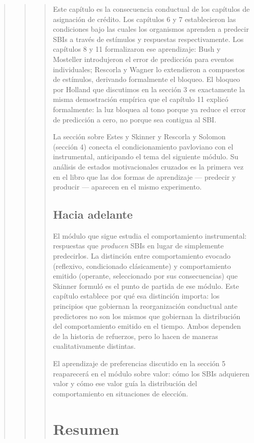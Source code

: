\documentclass[
  letterpaper,
  DIV=11,
  numbers=noendperiod]{scrreprt}
\begin{document}
\begin{tcolorbox}[enhanced jigsaw, arc=.35mm, bottomrule=.15mm, breakable, colback=white, colframe=quarto-callout-note-color-frame, left=2mm, leftrule=.75mm, opacityback=0, rightrule=.15mm, toprule=.15mm]
\begin{quote}
\begin{quote}
\begin{quote}
Este capítulo es la consecuencia conductual de los capítulos de
asignación de crédito. Los capítulos 6 y 7 establecieron las condiciones
bajo las cuales los organismos aprenden a predecir SBIs a través de
estímulos y respuestas respectivamente. Los capítulos 8 y 11
formalizaron ese aprendizaje: Bush y Mosteller introdujeron el error de
predicción para eventos individuales; Rescorla y Wagner lo extendieron a
compuestos de estímulos, derivando formalmente el bloqueo. El bloqueo
por Holland que discutimos en la sección 3 es exactamente la misma
demostración empírica que el capítulo 11 explicó formalmente: la luz
bloquea al tono porque ya reduce el error de predicción a cero, no
porque sea contigua al SBI.

La sección sobre Estes y Skinner y Rescorla y Solomon (sección 4)
conecta el condicionamiento pavloviano con el instrumental, anticipando
el tema del siguiente módulo. Su análisis de estados motivacionales
cruzados es la primera vez en el libro que las dos formas de aprendizaje
--- predecir y producir --- aparecen en el mismo experimento.

\mbox{}%
\subsection{Hacia adelante}\label{hacia-adelante}

El módulo que sigue estudia el comportamiento instrumental: respuestas
que \emph{producen} SBIs en lugar de simplemente predecirlos. La
distinción entre comportamiento evocado (reflexivo, condicionado
clásicamente) y comportamiento emitido (operante, seleccionado por sus
consecuencias) que Skinner formuló es el punto de partida de ese módulo.
Este capítulo establece por qué esa distinción importa: los principios
que gobiernan la reorganización conductual ante predictores no son los
mismos que gobiernan la distribución del comportamiento emitido en el
tiempo. Ambos dependen de la historia de refuerzos, pero lo hacen de
maneras cualitativamente distintas.

El aprendizaje de preferencias discutido en la sección 5 reaparecerá en
el módulo sobre valor: cómo los SBIs adquieren valor y cómo ese valor
guía la distribución del comportamiento en situaciones de elección.

\mbox{}%
\section{Resumen}\label{resumen-6}


\end{quote}
\end{quote}
\end{quote}
\end{tcolorbox}
\end{document}
